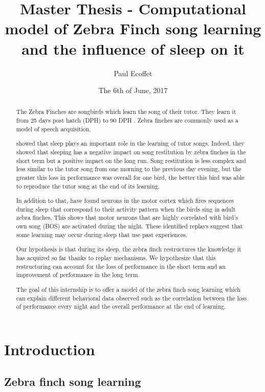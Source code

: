\documentclass{report}
\title{Master Thesis - Computational model of Zebra Finch song learning and the
influence of sleep on it}
\author{Paul Ecoffet}
\date{The 6th of June, 2017}
\begin{document}
\maketitle

\begin{abstract}
The Zebra Finches are songbirds which learn the song of their tutor. They learn
it from 25 days post hatch (DPH) to 90 DPH \parencite{liu_juvenile_2004}. Zebra
finches are commonly used as a model of speech acquisition.

\textcite{deregnaucourt_how_2005} showed that sleep plays an important role in
the learning of tutor songs. Indeed, they showed that sleeping has a negative
impact on song restitution by zebra finches in the short term but a positive
impact on the long run. Song restitution is less complex and less similar to the
tutor song from one morning to the previous day evening, but the greater this
loss in performance was overall for one bird, the better this bird was able to
reproduce the tutor song at the end of its learning.

In addition to that, \textcite{dave_song_2000} have found neurons in the motor
cortex which fires sequences during sleep that correspond to their activity
pattern when the birds sing in adult zebra finches. This shows that motor
neurons that are highly correlated with bird's own song (BOS) are activated
during the night. These identified replays suggest that some learning may occur
during sleep that use past experiences.

Our hypothesis is that during its sleep, the zebra finch restructures the
knowledge it has acquired so far thanks to replay mechanisms. We hypothesize
that this restructuring can account for the loss of performance in the short
term and an improvement of performance in the long term.

The goal of this internship is to offer a model of the zebra finch song
learning which can explain different behavioral data observed such as the
correlation between the loss of performance every night and the overall
performance at the end of learning.
\end{abstract}

\tableofcontents

\chapter{Introduction}

\section{Zebra finch song learning}
\end{document}
